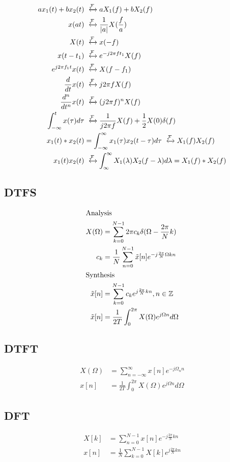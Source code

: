 \begin{align*}
    a x_1(t) + b x_2(t) & \xleftrightarrow{\mathcal{F}} a X_1(f) + b X_2(f)\\
    x(a t) &\xleftrightarrow{\mathcal{F}} \frac{1}{|a|} X(\frac{f}{a})\\
    X(t) &\xleftrightarrow{\mathcal{F}} x(-f)\\
    x(t-t_1) &\xleftrightarrow{\mathcal{F}} e^{-j2\pi ft_1}X(f)\\
    e^{j2\pi f_1 t}x(t) &\xleftrightarrow{\mathcal{F}} X(f-f_1)\\
    \frac{d}{dt}x(t) &\xleftrightarrow{\mathcal{F}} j2\pi fX(f)\\
    \frac{d^n}{dt^n}x(t) &\xleftrightarrow{\mathcal{F}} (j2\pi f)^n X(f)\\
    \int_{-\infty}^t x(\tau)d\tau &\xleftrightarrow{\mathcal{F}} \frac{1}{j2\pi f}X(f) + \frac{1}{2}X(0)\delta(f)\\
    x_1(t) * x_2(t) &= \int_{-\infty}^\infty x_1(\tau)x_2(t-\tau)d\tau \xleftrightarrow{\mathcal{F}} X_1(f)X_2(f)\\
    x_1(t) x_2(t) &\xleftrightarrow{\mathcal{F}} \int_{\infty}^\infty X_1(\lambda)X_2(f-\lambda)d\lambda = X_1(f)*X_2(f)
\end{align*}
\subsection{DTFS}
\begin{align*}
    \intertext{Analysis}
    X(\Omega) &= \sum_{k=0}^{N-1}2\pi c_k \delta(\Omega-\frac{2\pi}{N}k)\\
    c_k &= \frac{1}{N}\sum_{n=0}^{N-1}\Tilde{x}[n]e^{-j\frac{2\pi}{N}\Omega kn}\\
    \intertext{Synthesis}
    \Tilde{x}[n] &= \sum_{k=0}^{N-1} c_k e^{j\frac{2\pi}{N}kn}, n\in \mathbb{Z}\\
    \Tilde{x}[n] &= \frac{1}{2T}\int_0^{2\pi}X(\Omega)e^{j\Omega n}d\Omega
\end{align*}
\subsection{DTFT}
\begin{align*}
    X(\Omega) &= \sum_{n=-\infty}^\infty x[n] e^{-j\Omega_n n}\\
    x[n] &= \frac{1}{2T}\int_0^{2\pi}X(\Omega)e^{j\Omega n}d\Omega
\end{align*}
\subsection{DFT}
\begin{align*}
    X[k] &= \sum_{n=0}^{N-1}x[n]e^{-j\frac{2\pi}{N}kn}\\
    x[n] &= \frac{1}{N}\sum_{k=0}^{N-1}X[k]e^{j\frac{2\pi}{N}kn}
\end{align*}
